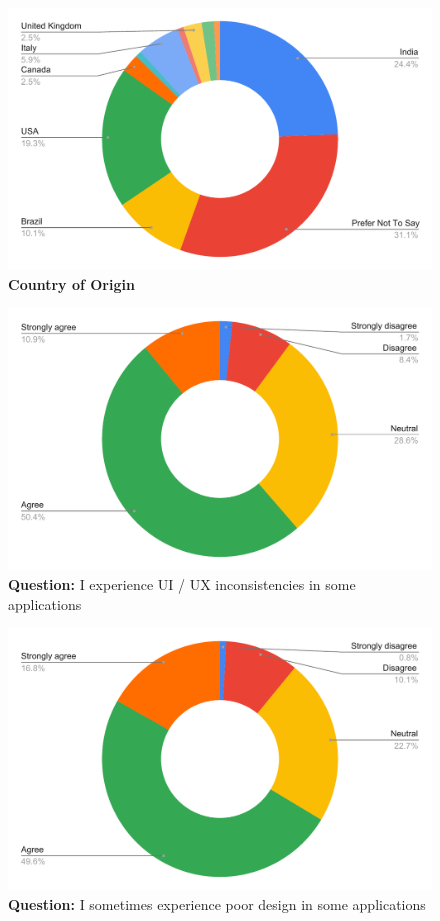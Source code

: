 \begin{figure}[H]
  \centering
  \includegraphics[width=13cm]{thesis/paper/images/p1_country.pdf}
  \textbf{Country of Origin}
\end{figure}

\begin{figure}[H]
  \centering
  \includegraphics[width=13cm]{thesis/paper/images/p1_q1.pdf}
  \textbf{Question:} I experience UI / UX inconsistencies in some applications
\end{figure}

\begin{figure}[H]
  \centering
  \includegraphics[width=13cm]{thesis/paper/images/p1_q2.pdf}
  \textbf{Question:} I sometimes experience poor design in some applications
\end{figure}

